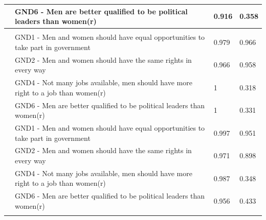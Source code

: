 \documentclass[12pt,twoside]{reedthesis}
\begin{document}
\begin{longtable}[l]{>{\raggedright\arraybackslash}p{4em}>{\raggedright\arraybackslash}p{19em}>{\raggedleft\arraybackslash}p{4em}>{\raggedleft\arraybackslash}p{4em}}
\cmidrule{2-4}\nopagebreak
\hspace{1em}\multirow[t]{-4}{4em}{\raggedright\arraybackslash Netherlands} & GND6 - Men are better qualified to be political leaders than women(r) & \textcolor{Myblue}{0.916} & \textcolor{Myred}{0.358}\\
\cmidrule{1-4}\pagebreak[0]
\addlinespace[0.3em]
\multicolumn{4}{l}{\textbf{South America}}\\
\hspace{1em} & GND1 - Men and women should have equal opportunities to take part in government & \textcolor{Myblue}{0.979} & \textcolor{Myblue}{0.966}\\
\cmidrule{2-4}\nopagebreak
\hspace{1em} & GND2 - Men and women should have the same rights in every way & \textcolor{Myblue}{0.966} & \textcolor{Myblue}{0.958}\\
\cmidrule{2-4}\nopagebreak
\hspace{1em} & GND4 - Not many jobs available, men should have more right to a job than women(r) & \textcolor{Myblue}{1} & \textcolor{Myred}{0.318}\\
\cmidrule{2-4}\nopagebreak
\hspace{1em}\multirow[t]{-4}{4em}{\raggedright\arraybackslash Chile} & GND6 - Men are better qualified to be political leaders than women(r) & \textcolor{Myblue}{1} & \textcolor{Myred}{0.331}\\
\cmidrule{1-4}\pagebreak[0]
\hspace{1em} & GND1 - Men and women should have equal opportunities to take part in government & \textcolor{Myblue}{0.997} & \textcolor{Myblue}{0.951}\\
\cmidrule{2-4}\nopagebreak
\hspace{1em} & GND2 - Men and women should have the same rights in every way & \textcolor{Myblue}{0.971} & \textcolor{Myblue}{0.898}\\
\cmidrule{2-4}\nopagebreak
\hspace{1em} & GND4 - Not many jobs available, men should have more right to a job than women(r) & \textcolor{Myblue}{0.987} & \textcolor{Myred}{0.348}\\
\cmidrule{2-4}\nopagebreak
\hspace{1em}\multirow[t]{-4}{4em}{\raggedright\arraybackslash Colombia} & GND6 - Men are better qualified to be political leaders than women(r) & \textcolor{Myblue}{0.956} & \textcolor{Myred}{0.433}\\*
\end{longtable}
\endgroup{}
\end{document}
